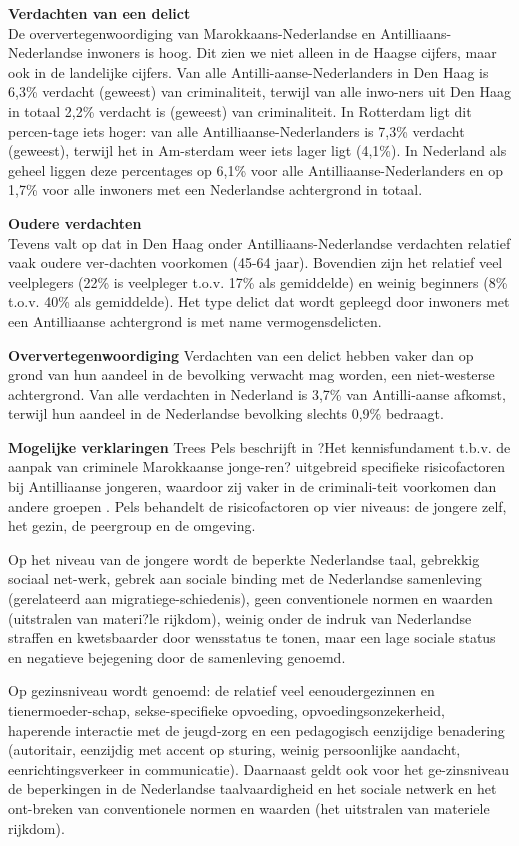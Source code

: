 \documentclass[]{book}
\begin{document}
\textbf{Verdachten van een delict}\\
De oververtegenwoordiging van Marokkaans-Nederlandse en
Antilliaans-Nederlandse inwoners is hoog. Dit zien we niet alleen in de
Haagse cijfers, maar ook in de landelijke cijfers. Van alle
Antilli-aanse-Nederlanders in Den Haag is 6,3\% verdacht (geweest) van
criminaliteit, terwijl van alle inwo-ners uit Den Haag in totaal 2,2\%
verdacht is (geweest) van criminaliteit. In Rotterdam ligt dit
percen-tage iets hoger: van alle Antilliaanse-Nederlanders is 7,3\%
verdacht (geweest), terwijl het in Am-sterdam weer iets lager ligt
(4,1\%). In Nederland als geheel liggen deze percentages op 6,1\% voor
alle Antilliaanse-Nederlanders en op 1,7\% voor alle inwoners met een
Nederlandse achtergrond in totaal.

\textbf{Oudere verdachten}\\
Tevens valt op dat in Den Haag onder Antilliaans-Nederlandse verdachten
relatief vaak oudere ver-dachten voorkomen (45-64 jaar). Bovendien zijn
het relatief veel veelplegers (22\% is veelpleger t.o.v. 17\% als
gemiddelde) en weinig beginners (8\% t.o.v. 40\% als gemiddelde). Het
type delict dat wordt gepleegd door inwoners met een Antilliaanse
achtergrond is met name vermogensdelicten.

\textbf{Oververtegenwoordiging} Verdachten van een delict hebben vaker
dan op grond van hun aandeel in de bevolking verwacht mag worden, een
niet-westerse achtergrond. Van alle verdachten in Nederland is 3,7\% van
Antilli-aanse afkomst, terwijl hun aandeel in de Nederlandse bevolking
slechts 0,9\% bedraagt.

\textbf{Mogelijke verklaringen} Trees Pels beschrijft in ?Het
kennisfundament t.b.v. de aanpak van criminele Marokkaanse jonge-ren?
uitgebreid specifieke risicofactoren bij Antilliaanse jongeren, waardoor
zij vaker in de criminali-teit voorkomen dan andere groepen
\citep{Pels2008}. Pels behandelt de risicofactoren op vier niveaus: de
jongere zelf, het gezin, de peergroup en de omgeving.

Op het niveau van de jongere wordt de beperkte Nederlandse taal,
gebrekkig sociaal net-werk, gebrek aan sociale binding met de
Nederlandse samenleving (gerelateerd aan migratiege-schiedenis), geen
conventionele normen en waarden (uitstralen van materi?le rijkdom),
weinig onder de indruk van Nederlandse straffen en kwetsbaarder door
wensstatus te tonen, maar een lage sociale status en negatieve
bejegening door de samenleving genoemd.

Op gezinsniveau wordt genoemd: de relatief veel eenoudergezinnen en
tienermoeder-schap, sekse-specifieke opvoeding, opvoedingsonzekerheid,
haperende interactie met de jeugd-zorg en een pedagogisch eenzijdige
benadering (autoritair, eenzijdig met accent op sturing, weinig
persoonlijke aandacht, eenrichtingsverkeer in communicatie). Daarnaast
geldt ook voor het ge-zinsniveau de beperkingen in de Nederlandse
taalvaardigheid en het sociale netwerk en het ont-breken van
conventionele normen en waarden (het uitstralen van materiele rijkdom).
\end{document}
